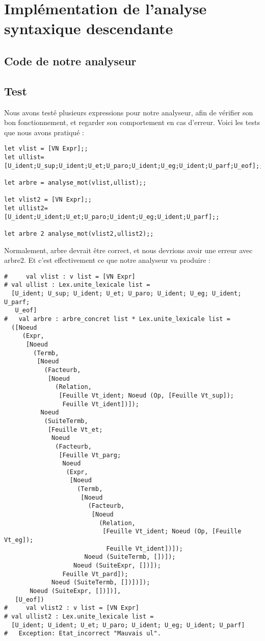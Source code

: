 \documentclass[11pt]{article} %
\begin{document}
\section{Implémentation de l'analyse syntaxique descendante}
\subsection{Code de notre analyseur}

\subsection{Test}
Nous avons testé plusieurs expressions pour notre analyseur, afin de vérifier son bon fonctionnement, et regarder son comportement en cas d'erreur.
Voici les tests que nous avons pratiqué : 
\begin{lstlisting}
let vlist = [VN Expr];;
let ullist= [U_ident;U_sup;U_ident;U_et;U_paro;U_ident;U_eg;U_ident;U_parf;U_eof];;

let arbre = analyse_mot(vlist,ullist);;

let vlist2 = [VN Expr];;
let ullist2= [U_ident;U_ident;U_et;U_paro;U_ident;U_eg;U_ident;U_parf];;

let arbre 2 analyse_mot(vlist2,ullist2);;

\end{lstlisting}
Normalement, arbre devrait être correct, et nous devrions avoir une erreur avec arbre2. Et c'est effectivement ce que notre analyseur va produire : 
\begin{lstlisting}
#     val vlist : v list = [VN Expr]
# val ullist : Lex.unite_lexicale list =
  [U_ident; U_sup; U_ident; U_et; U_paro; U_ident; U_eg; U_ident; U_parf;
   U_eof]
#   val arbre : arbre_concret list * Lex.unite_lexicale list =
  ([Noeud
     (Expr,
      [Noeud
        (Termb,
         [Noeud
           (Facteurb,
            [Noeud
              (Relation,
               [Feuille Vt_ident; Noeud (Op, [Feuille Vt_sup]);
                Feuille Vt_ident])]);
          Noeud
           (SuiteTermb,
            [Feuille Vt_et;
             Noeud
              (Facteurb,
               [Feuille Vt_parg;
                Noeud
                 (Expr,
                  [Noeud
                    (Termb,
                     [Noeud
                       (Facteurb,
                        [Noeud
                          (Relation,
                           [Feuille Vt_ident; Noeud (Op, [Feuille Vt_eg]);
                            Feuille Vt_ident])]);
                      Noeud (SuiteTermb, [])]);
                   Noeud (SuiteExpr, [])]);
                Feuille Vt_pard]);
             Noeud (SuiteTermb, [])])]);
       Noeud (SuiteExpr, [])])],
   [U_eof])
#     val vlist2 : v list = [VN Expr]
# val ullist2 : Lex.unite_lexicale list =
  [U_ident; U_ident; U_et; U_paro; U_ident; U_eg; U_ident; U_parf]
#   Exception: Etat_incorrect "Mauvais ul".
\end{lstlisting}
\end{document}
